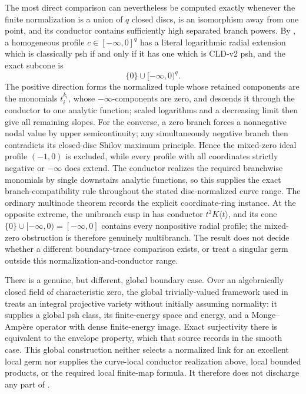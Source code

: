 The most direct comparison can nevertheless be computed exactly whenever
the finite normalization is a union of \(q\) closed discs, is an isomorphism
away from one point, and its conductor contains sufficiently high separated
branch powers.  By
, a homogeneous
profile \(c\in[-\infty,0]^q\) has a literal logarithmic radial extension
which is classically psh if and only if it has one which is CLD-v2 psh, and
the exact subcone is
\[
                         \{0\}\cup[-\infty,0)^q.
\]
The positive direction forms the normalized tuple whose retained components
are the monomials \(t_i^{k_i}\), whose \(-\infty\)-components are zero, and
descends it through the conductor to one analytic function; scaled
logarithms and a decreasing limit then give all remaining slopes.  For the
converse, a
zero branch forces a nonnegative nodal value by upper semicontinuity; any
simultaneously negative branch then contradicts its closed-disc Shilov
maximum principle.  Hence the mixed-zero ideal profile \((-1,0)\) is
excluded, while every profile with all coordinates strictly negative or
\(-\infty\) does extend.  The conductor realizes the required branchwise
monomials by single downstairs analytic functions, so this supplies the
exact branch-compatibility rule throughout the stated disc-normalized
curve range.  The ordinary multinode theorem
 records the explicit
coordinate-ring instance.  At the opposite extreme, the unibranch cusp in
 has conductor
\(t^2K\langle t\rangle\), and its cone
\(\{0\}\cup[-\infty,0)=[-\infty,0]\) contains every nonpositive radial
profile; the mixed-zero obstruction is therefore genuinely multibranch.
The result does not decide whether a different
boundary-trace comparison exists, or treat a singular germ outside this
normalization-and-conductor range.

There is a genuine, but different, global boundary case.  Over an
algebraically closed field of characteristic zero, the global
trivially-valued framework used in \cite[\S2]{BJKS2} treats an integral
projective variety without initially assuming normality: it supplies a
global psh class, its finite-energy space and energy, and a
Monge--Amp\`ere operator with dense finite-energy image.  Exact
surjectivity there is equivalent to the envelope property, which that
source records in the smooth case.  This global construction neither
selects a normalized link for an excellent local germ nor supplies the
curve-local conductor realization above, local bounded products, or the
required local finite-map formula.
It therefore does not discharge any part of
.

